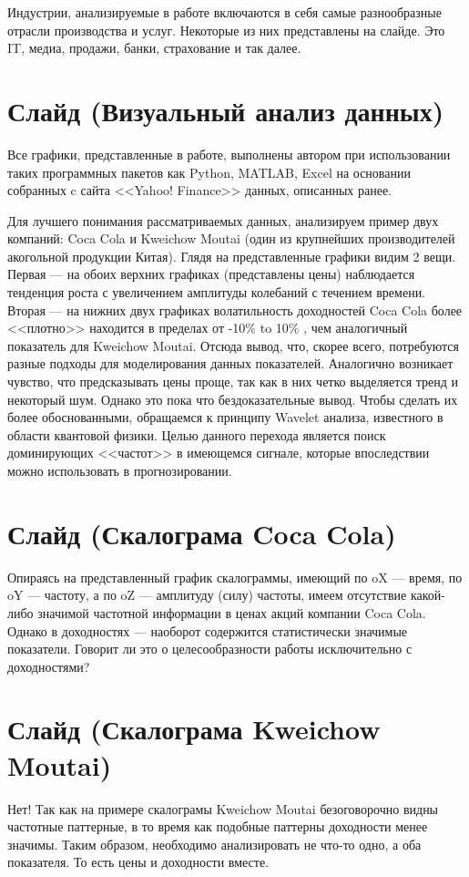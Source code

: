 \documentclass[a4paper, 12pt]{article}
\begin{document}
		Индустрии, анализируемые в работе включаются в себя самые разнообразные отрасли производства и услуг. Некоторые из них представлены на слайде. Это IT, медиа, продажи, банки, страхование и так далее.
	\section{Слайд (Визуальный анализ данных)}
		Все графики, представленные в работе, выполнены автором при использовании таких программных пакетов как Python, MATLAB, Excel на основании собранных c сайта <<Yahoo! Finance>> данных, описанных ранее.
		
		Для лучшего понимания рассматриваемых данных, анализируем пример двух компаний: Coca Cola и Kweichow Moutai (один из крупнейших производителей акогольной продукции Китая). Глядя на представленные графики видим 2 вещи. Первая --- на обоих верхних графиках (представлены цены) наблюдается тенденция роста с увеличением амплитуды колебаний с течением времени. Вторая --- на нижних двух графиках волатильность доходностей Coca Cola более <<плотно>> находится в пределах от -10\% to 10\% , чем аналогичный показатель для Kweichow Moutai. Отсюда вывод, что, скорее всего, потребуются разные подходы для моделирования данных показателей. Аналогично возникает чувство, что предсказывать цены проще, так как в них четко выделяется тренд и некоторый шум. Однако это пока что бездоказательные вывод. Чтобы сделать их более обоснованными, обращаемся к принципу Wavelet анализа, известного в области квантовой физики. Целью данного перехода является поиск доминирующих <<частот>> в имеющемся сигнале, которые впоследствии можно использовать в прогнозировании.
	\section{Слайд (Скалограма Coca Cola)}
		Опираясь на представленный график скалограммы, имеющий по oX --- время, по oY --- частоту, а по oZ --- амплитуду (силу) частоты, имеем отсутствие какой-либо значимой частотной информации в ценах акций компании Coca Cola. Однако в доходностях --- наоборот содержится статистически значимые показатели. Говорит ли это о целесообразности работы исключительно с доходностями?
	\section{Слайд (Скалограма Kweichow Moutai)}
		Нет! Так как на примере скалограмы Kweichow Moutai безоговорочно видны частотные паттерные, в то время как подобные паттерны доходности менее значимы. Таким образом, необходимо анализировать не что-то одно, а оба показателя. То есть цены и доходности вместе.
\end{document}
